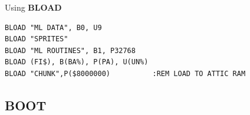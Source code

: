 \begin{description}[leftmargin=2cm,style=nextline]
\item [Examples:] Using {\bf BLOAD}
\begin{tcolorbox}[colback=black,coltext=white]
\verbatimfont{\codefont}
\begin{verbatim}
BLOAD "ML DATA", B0, U9
BLOAD "SPRITES"
BLOAD "ML ROUTINES", B1, P32768
BLOAD (FI$), B(BA%), P(PA), U(UN%)
BLOAD "CHUNK",P($8000000)          :REM LOAD TO ATTIC RAM
\end{verbatim}
\end{tcolorbox}
\end{description}


\newpage
\subsection{BOOT}
